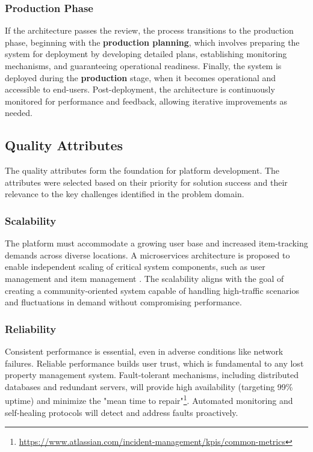 \subsubsection{Production Phase}

If the architecture passes the review, the process transitions to the production phase, beginning with the \textbf{production planning}, which involves preparing the system for deployment by developing detailed plans, establishing monitoring mechanisms, and guaranteeing operational readiness. Finally, the system is deployed during the \textbf{production} stage, when it becomes operational and accessible to end-users. Post-deployment, the architecture is continuously monitored for performance and feedback, allowing iterative improvements as needed.


\subsection{Quality Attributes} \label{section:quality_attributes}

The quality attributes form the foundation for platform development. The attributes were selected based on their priority for solution success and their relevance to the key challenges identified in the problem domain.

\subsubsection{Scalability}

The platform must accommodate a growing user base and increased item-tracking demands across diverse locations. A microservices architecture is proposed to enable independent scaling of critical system components, such as user management and item management \cite{Al-Debagy2021}. The scalability aligns with the goal of creating a community-oriented system capable of handling high-traffic scenarios and fluctuations in demand without compromising performance.

\subsubsection{Reliability} 

Consistent performance is essential, even in adverse conditions like network failures. Reliable performance builds user trust, which is fundamental to any lost property management system. Fault-tolerant mechanisms, including distributed databases and redundant servers, will provide high availability (targeting 99\% uptime) and minimize the "mean time to repair"\footnote{\url{https://www.atlassian.com/incident-management/kpis/common-metrics}}. Automated monitoring and self-healing protocols will detect and address faults proactively.


